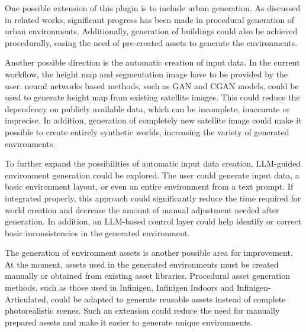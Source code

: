 One possible extension of this plugin is to include urban generation. As discussed in related works, significant progress has been made in procedural generation of urban environments. Additionally, generation of buildings could also be achieved procedurally, easing the need of pre-created assets to generate the environments.

Another possible direction is the automatic creation of input data. In the current workflow, the height map and segmentation image have to be provided by the user. neural networks based methods, such as \ac{GAN} and \ac{CGAN} models, could be used to generate height map from existing satellite images. This could reduce the dependency on publicly available data, which can be incomplete, inaccurate or imprecise. In addition, generation of completely new satellite image could make it possible to create entirely synthetic worlds, increasing the variety of generated environments.

To further expand the possibilities of automatic input data creation, \ac{LLM}-guided environment generation could be explored. The user could generate input data, a basic environment layout, or even an entire environment from a text prompt. If integrated properly, this approach could significantly reduce the time required for world creation and decrease the amount of manual adjustment needed after generation. In addition, an \ac{LLM}-based control layer could help identify or correct basic inconsistencies in the generated environment.

The generation of environment assets is another possible area for improvement. At the moment, assets used in the generated environments must be created manually or obtained from existing asset libraries.  Procedural asset generation methods, such as those used in Infinigen, Infinigen Indoors and Infinigen-Articulated, could be adapted to generate reusable assets instead of complete photorealistic scenes. Such an extension could reduce the need for manually prepared assets and make it easier to generate unique environments.